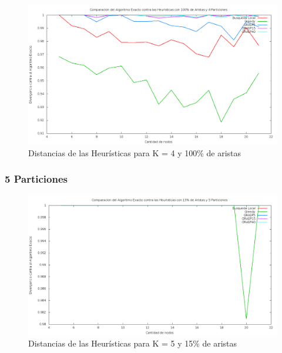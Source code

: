\begin{figure}[H]
\begin{center}
\includegraphics[scale=0.3]{finales/ComparacionesCon4Particiones100Aristas.png}
\caption{Distancias de las Heur\'isticas para K = 4 y 100\% de aristas}
\end{center}
\end{figure}

\subsubsection{5 Particiones}

\begin{figure}[H]
\begin{center}
\includegraphics[scale=0.3]{finales/ComparacionesCon5Particiones15Aristas.png}
\caption{Distancias de las Heur\'isticas para K = 5 y 15\% de aristas}
\end{center}
\end{figure}

